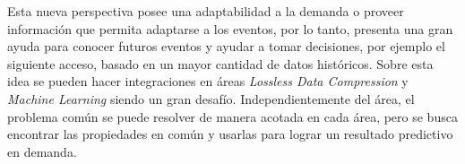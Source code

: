   Esta nueva perspectiva posee una adaptabilidad a la demanda o proveer información que permita adaptarse a los eventos, por lo tanto, presenta una gran ayuda para conocer futuros eventos y ayudar a tomar decisiones, por ejemplo el siguiente acceso, basado en un mayor cantidad de datos históricos. Sobre esta idea se pueden hacer integraciones en áreas \emph{Lossless Data Compression} y \emph{Machine Learning} siendo un gran desafío. Independientemente del área, el problema común  se puede resolver de manera acotada en cada área, pero se busca encontrar las propiedades en común y usarlas para lograr un resultado predictivo en demanda.  